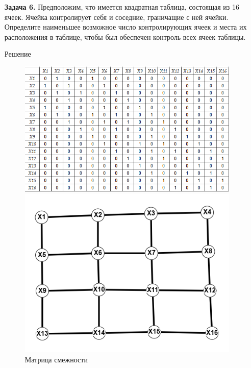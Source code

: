 \documentclass{article}
\begin{document}
\begin{enumerate}
\item[\textbf{Задача 6.}] Предположим, что имеется квадратная таблица, состоящая из 16 ячеек. Ячейка контролирует себя и соседние, граничащие с ней ячейки. Определите наименьшее возможное число контролирующих ячеек и места их расположения в таблице, чтобы был обеспечен контроль всех ячеек таблицы.
\\
\begin{center}
Решение 
\end{center}
\begin{figure}[ht]
  \begin{minipage}[b]{0.5\textwidth}
    \centering
    \includegraphics[width=\textwidth, center]{attachments/6/matrix.png}
    \caption{Матрица смежности}
    \label{fig:6_adj_matrix}
  \end{minipage}
  \hfill
  \begin{minipage}[b]{0.5\textwidth}
    \centering
    \includegraphics[width=.8\textwidth, center]{attachments/6/graph.png}

\end{minipage}
\end{figure}
\end{enumerate}
\end{document}
